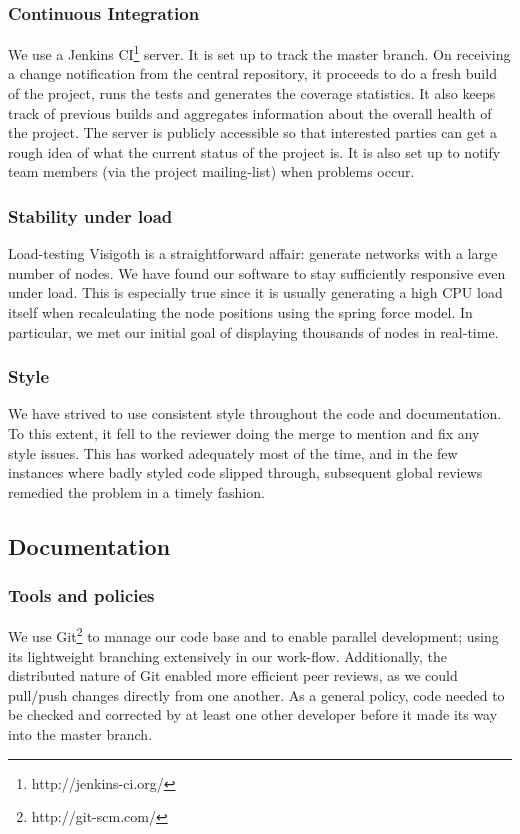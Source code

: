 \documentclass[a4paper,11pt,titlepage]{article}
\begin{document}
\subsubsection{Continuous Integration}
We use a Jenkins CI\footnote{http://jenkins-ci.org/} server. It is
set up to track the master branch. On receiving a change notification
from the central repository, it proceeds to do a fresh build of the
project, runs the tests and generates the coverage statistics. It
also keeps track of previous builds and aggregates information about
the overall health of the project.
The server is publicly accessible so that interested parties can get
a rough idea of what the current status of the project is. It is also
set up to notify team members (via the project mailing-list) when
problems occur.

\subsubsection{Stability under load}
Load-testing Visigoth is a straightforward affair: generate networks
with a large number of nodes. We have found our software to stay
sufficiently responsive even under load. This is especially true
since it is usually generating a high CPU load itself when
recalculating the node positions using the spring force model. In
particular, we met our initial goal of displaying thousands of nodes
in real-time.

\subsubsection{Style}
We have strived to use consistent style throughout the code and
documentation. To this extent, it fell to the reviewer doing the
merge to mention and fix any style issues. This has worked adequately
most of the time, and in the few instances where badly styled code
slipped through, subsequent global reviews remedied the problem in a
timely fashion.


\subsection{Documentation}

\subsubsection{Tools and policies}
We use Git\footnote{http://git-scm.com/} to manage our code base and
to enable parallel development; using its lightweight branching
extensively in our work-flow. Additionally, the distributed nature
of Git enabled more efficient peer reviews, as we could pull/push
changes directly from one another. As a general policy, code needed
to be checked and corrected by at least one other developer before it
made its way into the master branch.
\end{document}
